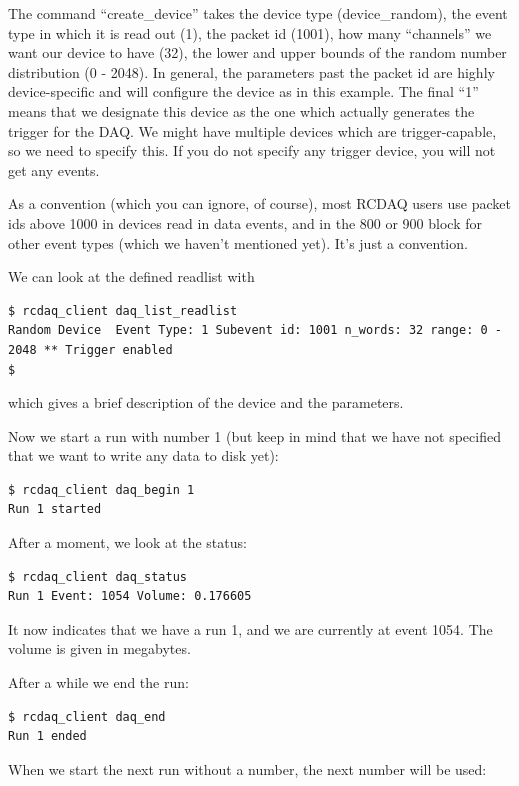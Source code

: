 \documentclass{article}[11pt]
\begin{document}
The command ``create\_device'' takes the device type (device\_random),
the event type in which it is read out (1), the packet id (1001), how
many ``channels'' we want our device to have (32), the lower and upper
bounds of the random number distribution (0 - 2048). In general, the
parameters past the packet id are highly device-specific and will
configure the device as in this example.  The final ``1'' means that
we designate this device as the one which actually generates the
trigger for the DAQ. We might have multiple devices which are
trigger-capable, so we need to specify this. If you do not specify any
trigger device, you will not get any events.

As a convention (which you can ignore, of course), most RCDAQ users
use packet ids above 1000 in devices read in data events, and in the
800 or 900 block for other event types (which we haven't mentioned
yet). It's just a convention.


We can look at the defined readlist with  

\begin{verbatim}
$ rcdaq_client daq_list_readlist
Random Device  Event Type: 1 Subevent id: 1001 n_words: 32 range: 0 - 2048 ** Trigger enabled
$ 
\end{verbatim}

which gives a brief description of the device and the parameters.

Now we start a run with number 1 (but keep in mind that we have not
specified that we want to write any data to disk yet):

\begin{verbatim}
$ rcdaq_client daq_begin 1
Run 1 started
\end{verbatim}

After a moment, we look at the status:

\begin{verbatim}
$ rcdaq_client daq_status 
Run 1 Event: 1054 Volume: 0.176605
\end{verbatim}

It now indicates that we have a run 1, and we are currently at event
1054. The volume is given in megabytes.

After a while we end the run:

\begin{verbatim}
$ rcdaq_client daq_end
Run 1 ended
\end{verbatim}

When we start the next run without a number, the next number will be used:
\end{document}
